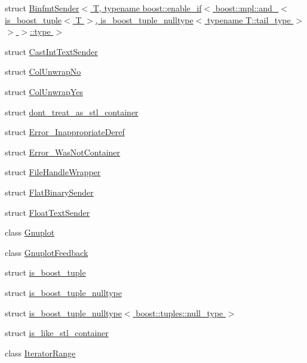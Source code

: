 \begin{DoxyCompactItemize}
\item 
struct \hyperlink{structgnuplotio_1_1_binfmt_sender_3_01_t_00_01typename_01boost_1_1enable__if_3_01boost_1_1mpl_1_8c86f170c2e2969f5519817e5c367132}{Binfmt\+Sender$<$ T, typename boost\+::enable\+\_\+if$<$ boost\+::mpl\+::and\+\_\+$<$ is\+\_\+boost\+\_\+tuple$<$ T $>$, is\+\_\+boost\+\_\+tuple\+\_\+nulltype$<$ typename T\+::tail\+\_\+type $>$ $>$ $>$\+::type $>$}
\item 
struct \hyperlink{structgnuplotio_1_1_cast_int_text_sender}{Cast\+Int\+Text\+Sender}
\item 
struct \hyperlink{structgnuplotio_1_1_col_unwrap_no}{Col\+Unwrap\+No}
\item 
struct \hyperlink{structgnuplotio_1_1_col_unwrap_yes}{Col\+Unwrap\+Yes}
\item 
struct \hyperlink{structgnuplotio_1_1dont__treat__as__stl__container}{dont\+\_\+treat\+\_\+as\+\_\+stl\+\_\+container}
\item 
struct \hyperlink{structgnuplotio_1_1_error___inappropriate_deref}{Error\+\_\+\+Inappropriate\+Deref}
\item 
struct \hyperlink{structgnuplotio_1_1_error___was_not_container}{Error\+\_\+\+Was\+Not\+Container}
\item 
struct \hyperlink{structgnuplotio_1_1_file_handle_wrapper}{File\+Handle\+Wrapper}
\item 
struct \hyperlink{structgnuplotio_1_1_flat_binary_sender}{Flat\+Binary\+Sender}
\item 
struct \hyperlink{structgnuplotio_1_1_float_text_sender}{Float\+Text\+Sender}
\item 
class \hyperlink{classgnuplotio_1_1_gnuplot}{Gnuplot}
\item 
class \hyperlink{classgnuplotio_1_1_gnuplot_feedback}{Gnuplot\+Feedback}
\item 
struct \hyperlink{structgnuplotio_1_1is__boost__tuple}{is\+\_\+boost\+\_\+tuple}
\item 
struct \hyperlink{structgnuplotio_1_1is__boost__tuple__nulltype}{is\+\_\+boost\+\_\+tuple\+\_\+nulltype}
\item 
struct \hyperlink{structgnuplotio_1_1is__boost__tuple__nulltype_3_01boost_1_1tuples_1_1null__type_01_4}{is\+\_\+boost\+\_\+tuple\+\_\+nulltype$<$ boost\+::tuples\+::null\+\_\+type $>$}
\item 
struct \hyperlink{structgnuplotio_1_1is__like__stl__container}{is\+\_\+like\+\_\+stl\+\_\+container}
\item 
class \hyperlink{classgnuplotio_1_1_iterator_range}{Iterator\+Range}

\end{DoxyCompactItemize}
